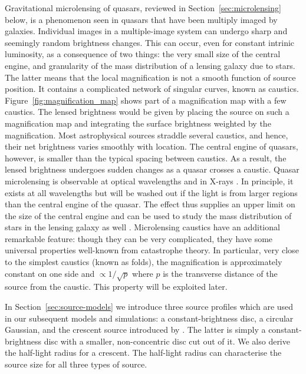 \documentclass[usenatbib]{mn2e}
\begin{document}
Gravitational microlensing of quasars, reviewed in
Section~\ref{sec:microlensing} below, is a phenomenon seen in quasars
that have been multiply imaged by galaxies.  Individual images in a
multiple-image system can undergo sharp and seemingly random
brightness changes.  This can occur, even for constant intrinic
luminosity, as a consequence of two things: the very small size of the
central engine, and granularity of the mass distribution of a lensing
galaxy due to stars.  The latter means that the local magnification is
not a smooth function of source position. It contains a complicated
network of singular curves, known as caustics.
Figure~\ref{fig:magnification_map} shows part of a magnification map
with a few caustics.  The lensed brightness would be given by placing
the source on such a magnification map and integrating the surface
brightness weighted by the magnification.  Most astrophysical sources
straddle several caustics, and hence, their net brightness varies
smoothly with location.  The central engine of quasars, however, is
smaller than the typical spacing between caustics.  As a result, the
lensed brightness undergoes sudden changes as a quasar crosses a
caustic.  Quasar microlensing is observable at optical
wavelengths \citep[e.g.,][]{2012A&A...544A..62S} and in
X-rays \citep[e.g.,][]{2016arXiv160207601N}.  In principle, it exists
at all wavelengths \citep[and has been argued for at cm wavelengths
  by][]{2000A&A...358..793K} but will be washed out if the light is
from larger regions than the central engine of the quasar.  The effect
thus supplies an upper limit on the size of the central engine
\citep[e.g.,][]{2015ApJ...814L..26M} and can be used to study the mass
distribution of stars in the lensing galaxy as well
\citep[e.g.,][]{2012ApJ...744..111P}.  Microlensing caustics have an
additional remarkable feature: though they can be very complicated,
they have some universal properties well-known from catastrophe
theory.  In particular, very close to the simplest caustics (known as
folds), the magnification is approximately constant on one side and
$\propto1/\sqrt p$ where $p$ is the transverse distance of the source
from the caustic.  This property will be exploited later.

In Section~\ref{sec:source-models} we introduce three source profiles
which are used in our subsequent models and simulations: a
constant-brightness disc, a circular Gaussian, and the crescent source
introduced by \cite{2013MNRAS.434..765K}.  The latter is simply a
constant-brightness disc with a smaller, non-concentric disc cut out
of it.  We also derive the half-light radius for a crescent.  The
half-light radius can characterise the source size for all three types
of source.
\end{document}
